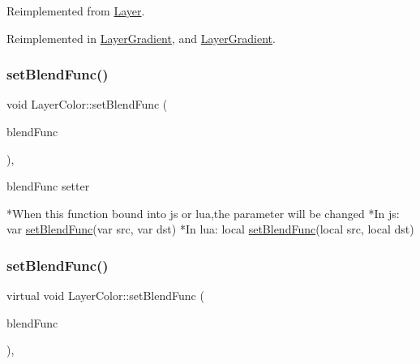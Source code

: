 Reimplemented from \hyperlink{classLayer_acadcdf383e0bf892c95213a4f7725672}{Layer}.



Reimplemented in \hyperlink{classLayerGradient_ace9ed0ed0422bdc89a7e440a9f8307d3}{Layer\+Gradient}, and \hyperlink{classLayerGradient_a95a281f25e6c4196664e9866e451fcc2}{Layer\+Gradient}.

\mbox{\label{classLayerColor_ae71bee82fac9f5b984a6fdaf69c97d73}} 
\subsubsection{\texorpdfstring{set\+Blend\+Func()}{setBlendFunc()}\hspace{0.1cm}{\footnotesize\ttfamily [1/2]}}
{\footnotesize\ttfamily void Layer\+Color\+::set\+Blend\+Func (\begin{DoxyParamCaption}\item[{const \hyperlink{structBlendFunc}{Blend\+Func} \&}]{blend\+Func }\end{DoxyParamCaption})\hspace{0.3cm}{\ttfamily [override]}, {\ttfamily [virtual]}}



blend\+Func setter 


\begin{DoxyCode}
*When \textcolor{keyword}{this} \textcolor{keyword}{function} bound into js or lua,the parameter will be changed
*In js: var \hyperlink{classLayerColor_ae71bee82fac9f5b984a6fdaf69c97d73}{setBlendFunc}(var src, var dst)
*In lua: local \hyperlink{classLayerColor_ae71bee82fac9f5b984a6fdaf69c97d73}{setBlendFunc}(local src, local dst)
\end{DoxyCode}
 \mbox{\label{classLayerColor_a8800e2c47de7beaf137c0e12007910bb}} 
\subsubsection{\texorpdfstring{set\+Blend\+Func()}{setBlendFunc()}\hspace{0.1cm}{\footnotesize\ttfamily [2/2]}}
{\footnotesize\ttfamily virtual void Layer\+Color\+::set\+Blend\+Func (\begin{DoxyParamCaption}\item[{const \hyperlink{structBlendFunc}{Blend\+Func} \&}]{blend\+Func }\end{DoxyParamCaption})\hspace{0.3cm}{\ttfamily [override]}, {\ttfamily [virtual]}}


